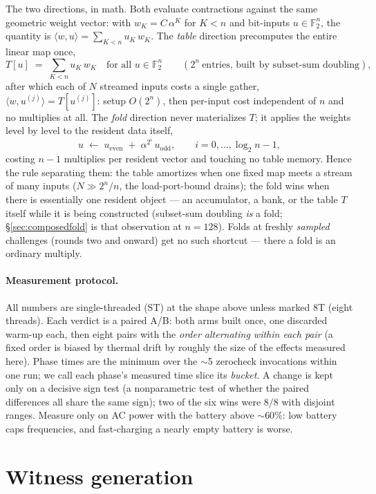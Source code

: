 \documentclass[11pt]{article}
\newcommand{\Ftwo}{\mathbb{F}_2}
\begin{document}
The two directions, in math. Both evaluate contractions against the same
geometric weight vector: with $w_K = C\,\alpha^K$ for $K < n$ and
bit-inputs $u \in \Ftwo^n$, the quantity is
$\langle w, u\rangle = \sum_{K<n} u_K\, w_K$. The \emph{table} direction
precomputes the entire linear map once,
\[
T[u] \;=\; \sum_{K<n} u_K\, w_K
\quad\text{for all } u\in\Ftwo^{n}
\qquad(2^{n}\ \text{entries, built by subset-sum doubling}),
\]
after which each of $N$ streamed inputs costs a single gather,
$\langle w, u^{(j)}\rangle = T[u^{(j)}]$: setup $O(2^{n})$, then per-input
cost independent of $n$ and no multiplies at all. The \emph{fold}
direction never materializes $T$; it applies the weights level by level
to the resident data itself,
\[
u \;\leftarrow\; u_{\mathrm{even}} \;+\; \alpha^{2^{i}}\, u_{\mathrm{odd}},
\qquad i = 0,\dots,\log_2 n - 1,
\]
costing $n-1$ multiplies per resident vector and touching no table
memory. Hence the rule separating them: the table amortizes when one
fixed map meets a stream of many inputs ($N \gg 2^{n}/n$, the
load-port-bound drains); the fold wins when there is essentially one
resident object --- an accumulator, a bank, or the table $T$ itself while
it is being constructed (subset-sum doubling \emph{is} a fold;
\S\ref{sec:composedfold} is that observation at $n=128$). Folds at
freshly \emph{sampled} challenges (rounds two and onward) get no such
shortcut --- there a fold is an ordinary multiply.

\paragraph{Measurement protocol.}
All numbers are single-threaded (ST) at the shape above unless marked 8T
(eight threads). Each verdict is a paired A/B: both arms built once, one
discarded warm-up each, then eight pairs with the \emph{order alternating
within each pair} (a fixed order is biased by thermal drift by roughly the
size of the effects measured here). Phase times are the minimum over the
$\sim$5 zerocheck invocations within one run; we call each phase's measured
time slice its \emph{bucket}. A change is kept only on a decisive sign test
(a nonparametric test of whether the paired differences all share the same
sign); two of the six wins were $8/8$ with disjoint ranges. Measure only on
AC power with the battery above $\sim60\%$: low battery caps frequencies,
and fast-charging a nearly empty battery is worse.

\section{Witness generation}
\end{document}
